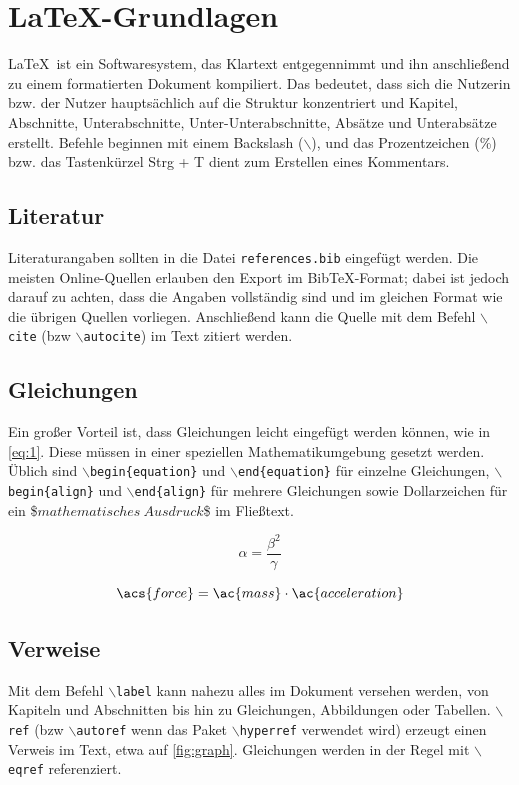 \chapter{LaTeX-Grundlagen}\label{app:latex}

\LaTeX\ ist ein Softwaresystem, das Klartext entgegennimmt und ihn anschließend zu einem formatierten Dokument kompiliert. Das bedeutet, dass sich die Nutzerin bzw. der Nutzer hauptsächlich auf die Struktur konzentriert und Kapitel, Abschnitte, Unterabschnitte, Unter-Unterabschnitte, Absätze und Unterabsätze erstellt. Befehle beginnen mit einem Backslash ($\backslash$), und das Prozentzeichen (\%) bzw. das Tastenkürzel Strg + T dient zum Erstellen eines Kommentars. %

\section{Literatur}
Literaturangaben sollten in die Datei \texttt{references.bib} eingefügt werden. Die meisten Online-Quellen erlauben den Export im BibTeX-Format; dabei ist jedoch darauf zu achten, dass die Angaben vollständig sind und im gleichen Format wie die übrigen Quellen vorliegen. Anschließend kann die Quelle mit dem Befehl \texttt{$\backslash$cite} (\ac{bzw} \texttt{$\backslash$autocite}) im Text zitiert werden.

\section{Gleichungen}

Ein großer Vorteil ist, dass Gleichungen leicht eingefügt werden können, wie in \autoref{eq:1}. Diese müssen in einer speziellen Mathematikumgebung gesetzt werden. Üblich sind \texttt{$\backslash$begin\{equation\}} und \texttt{$\backslash$end\{equation\}} für einzelne Gleichungen, \texttt{$\backslash$begin\{align\}} und \texttt{$\backslash$end\{align\}} für mehrere Gleichungen sowie Dollarzeichen für ein \$$mathematisches\ Ausdruck$\$ im Fließtext.

\begin{equation}
	\alpha = \frac{\beta^2}{\gamma}\label{eq:1}
\end{equation}

\begin{equation}
	\acs{force} = \ac{mass} \cdot \ac{acceleration}\label{eq:2}
\end{equation}


\section{Verweise}
Mit dem Befehl \texttt{$\backslash$label} kann nahezu alles im Dokument versehen werden, von Kapiteln und Abschnitten bis hin zu Gleichungen, Abbildungen oder Tabellen. \texttt{$\backslash$ref} (\ac{bzw} \texttt{$\backslash$autoref} wenn das Paket \texttt{$\backslash$hyperref} verwendet wird) erzeugt einen Verweis im Text, etwa auf \autoref{fig:graph}. Gleichungen werden in der Regel mit \texttt{$\backslash$eqref} referenziert.

